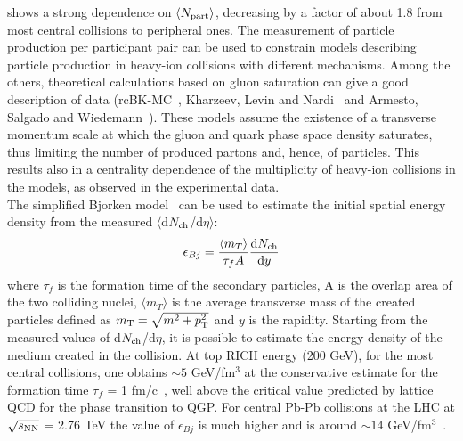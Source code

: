 shows a strong dependence on $\langle N_{\rm part}\rangle$, decreasing 
by a factor of about 1.8 from most central collisions to peripheral ones. The 
measurement of particle production per participant pair can be used to 
constrain models describing particle production in heavy-ion collisions 
with different mechanisms. Among the others, theoretical calculations 
 based on gluon saturation can give a good description of data
 (rcBK-MC~\cite{Albacete:2011fw}, Kharzeev, Levin and Nardi~\cite{Kharzeev:2004if} 
 and Armesto, Salgado and Wiedemann~\cite{Armesto:2004ud}). These models assume the existence of a
 transverse momentum scale at which the gluon and quark phase space 
 density saturates, thus limiting the number of produced partons and, 
 hence, of particles.
 This results also in a centrality dependence of the multiplicity of 
 heavy-ion collisions in the models, as observed in the experimental
data. \\
The simplified Bjorken model~\cite{Bjorken:1982qr} can be used to 
estimate the initial spatial energy density from the measured 
$\langle$d$N_{\rm ch}$/d$\eta$$\rangle$:
\begin{equation}
\label{Bjorken}
\epsilon_{Bj} = \frac{\langle m_T\rangle}{\tau_f A}\frac{{\rm d}N_{\rm ch}}{{\rm d}y}
\end{equation}
where $\tau_f$ is the formation time of the secondary particles, A is the overlap 
area of the two colliding nuclei, $\langle m_T \rangle$ is the average transverse 
mass of the created particles defined as $m_{\rm T} = \sqrt{m^{2}+p_{\rm T}^2}$ and $y$ 
is the rapidity. Starting from the measured values of d$N_{\rm ch}$/d$\eta$, it is 
possible to estimate the energy density of the medium created in the collision.
At top RICH energy (200 GeV), for the most central collisions, one obtains 
$\sim 5$ GeV/fm$^3$ at the conservative estimate for the formation time 
$\tau_f$ = 1 fm/c~\cite{Bjorken:1982qr}, well above the critical value predicted 
by lattice QCD for the phase transition to QGP. For central Pb-Pb collisions at the LHC 
at $\sqrt{s_{\rm NN}}$ = 2.76 TeV the value of $\epsilon_{Bj}$ is much higher and is 
around $\sim 14$ GeV/fm$^3$~\cite{Chatrchyan:2012mb}.

